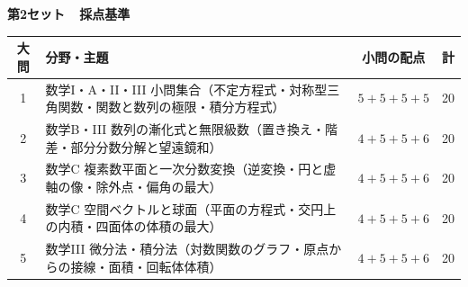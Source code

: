 \clearpage
{}

\noindent
{\Large\sffamily\bfseries 第2セット\ \ 採点基準}
\par\vspace{2mm}

\begin{center}
\small
\renewcommand{\arraystretch}{1.3}
\begin{tabular}{@{}clcc@{}}
\toprule
\textbf{大問} & \textbf{分野・主題} & \textbf{小問の配点} & \textbf{計} \\
\midrule
1 & 数学I・A・II・III 小問集合（不定方程式・対称型三角関数・関数と数列の極限・積分方程式） & $5 + 5 + 5 + 5$ & 20 \\
2 & 数学B・III 数列の漸化式と無限級数（置き換え・階差・部分分数分解と望遠鏡和） & $4 + 5 + 5 + 6$ & 20 \\
3 & 数学C 複素数平面と一次分数変換（逆変換・円と虚軸の像・除外点・偏角の最大） & $4 + 5 + 5 + 6$ & 20 \\
4 & 数学C 空間ベクトルと球面（平面の方程式・交円上の内積・四面体の体積の最大） & $4 + 5 + 5 + 6$ & 20 \\
5 & 数学III 微分法・積分法（対数関数のグラフ・原点からの接線・面積・回転体体積） & $4 + 5 + 5 + 6$ & 20 \\
\bottomrule
\end{tabular}
\end{center}

